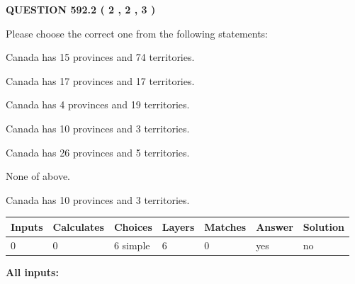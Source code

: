 \documentclass[12pt]{article}
\begin{document}
   
  
\vspace{0.2in}
  
{\textbf{\Large{QUESTION
592.2 
 ( 2 , 2 , 3 )
}}}
  
  
Please choose the correct one from the following statements:
 
 
Canada has  15 provinces and  74 territories.
 
 
Canada has  17 provinces and  17 territories.
 
 
Canada has   4 provinces and  19 territories.
 
 
Canada has 10  provinces and 3 territories.
 
 
Canada has  26 provinces and  5 territories.
 
 
 None of above.
 
 
\noindent{}
 
 
Canada has 10  provinces and 3 territories.
 
 
\noindent{}
 
 
   
   
   
   
\noindent\begin{tabular}{|l|l|l|l|l|l|l|}
 \hline
Inputs & Calculates & Choices & Layers & Matches & Answer & Solution \\ \hline
 0  & 
 0  & 
 6
  simple  
  & 
 6  & 
 0  & 
  yes & 
  no 
  \\ \hline
 \end{tabular}
   
   
   
   
\noindent{}
   
   
   
   
\noindent\vspace{0.1in}\hspace{-0.08in} {\textbf{\Large{All inputs: }}}
   
   
   
   
   
   
 \vspace{0.2in}
 
\end{document}
